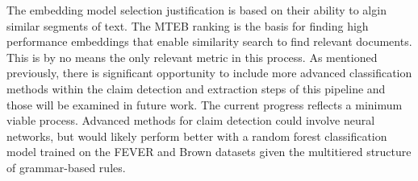 \documentclass[11pt,letterpaper]{article}
\begin{document}
{


The embedding model selection justification is based on their ability to algin similar segments of text. The MTEB ranking is the basis for finding high performance embeddings that enable similarity search to find relevant documents. This is by no means the only relevant metric in this process. As mentioned previously, there is significant opportunity to include more advanced classification methods within the claim detection and extraction steps of this pipeline and those will be examined in future work. The current progress reflects a minimum viable process. Advanced methods for claim detection could involve neural networks, but would likely perform better with a random forest classification model trained on the FEVER and Brown datasets given the multitiered structure of grammar-based rules. \\

}




\end{document}
